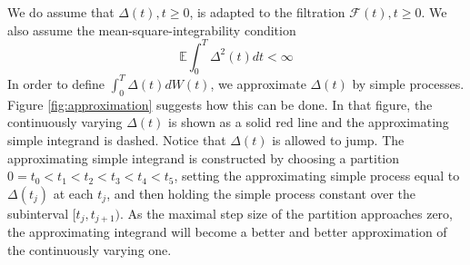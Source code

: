\documentclass[\topdir/lecture\_notes.tex]{subfiles}
\begin{document}
We do assume that \(\Delta(t), t \geq 0\), is adapted to the filtration \(\mathcal{F}(t), t \geq 0\). We also assume the mean-square-integrability condition
\begin{equation}
\mathbb{E} \int_{0}^{T} \Delta^{2}(t) d t<\infty
\end{equation}
In order to define \(\int_{0}^{T} \Delta(t) d W(t)\), we approximate \(\Delta(t)\) by simple processes. Figure \ref{fig:approximation} suggests how this can be done. In that figure, the continuously varying \(\Delta(t)\) is shown as a solid red line and the approximating simple integrand is dashed. Notice that \(\Delta(t)\) is allowed to jump. The approximating simple integrand is constructed by choosing a partition \(0=t_{0}<t_{1}<t_{2}<t_{3}<t_{4}<t_{5}\), setting the approximating simple process equal to \(\Delta(t_{j})\) at each \(t_{j}\), and then holding the simple process constant over the subinterval \([t_{j}, t_{j+1})\). As the maximal step size of the partition approaches zero, the approximating integrand will become a better and better approximation of the continuously varying one.
\end{document}
